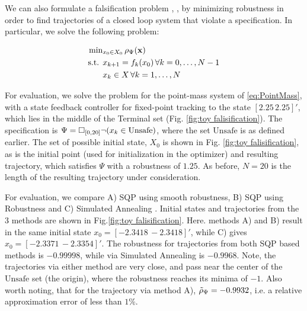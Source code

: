 We can also formulate a falsification problem \cite{AbbasATVA11_LinFalsification}, \cite{AbbasF_HybridSA12}, \cite{Deshmukh15_IterativeApproaches} by minimizing robustness in order to find trajectories of a closed loop system that violate a specification. In particular, we solve the following problem:

\begin{subequations}
\label{eq:falsification}
\begin{align}
\text{min}&_{x_0 \in X_0 } \, \rho_{\Psi}(\mathbf{x}) \nonumber \\
\text{s.t. } & x_{k+1} = f_k(x_0) \, \forall k=0,\dotsc,N-1 \\
&  x_{k} \in X \, \forall k=1,\dotsc,N
\end{align}
\end{subequations}

For evaluation, we solve the problem for the point-mass system of \eqref{eq:PointMass}, with a state feedback controller for fixed-point tracking to the state $[2.25\,2.25]'$, which lies in the middle of the Terminal set (Fig. \ref{fig:toy falisification}). The specification is $\Psi=\square_{[0,20]} \neg (x_k \in \text{Unsafe})$, where the set $\text{Unsafe}$ is as defined earlier. The set of possible initial state, $X_0$ is shown in Fig. \ref{fig:toy falisification}, as is the initial point (used for initialization in the optimizer) and resulting trajectory, which satisfies $\Psi$ with a robustness of $1.25$. As before, $N=20$ is the length of the resulting trajectory under consideration.

For evaluation, we compare A) SQP using smooth robustness, B) SQP using Robustness and C) Simulated Annealing \cite{SABOOK}. Initial states and trajectories from the 3 methods are shown in Fig.\ref{fig:toy falisification}. Here. methods A) and B) result in the same initial state $x_0=[-2.3418\, -2.3418]'$, while C) gives $x_0=[-2.3371\, -2.3354]'$. The robustness for trajectories from both SQP based methods is $-0.99998$, while via Simulated Annealing is $-0.9968$. Note, the trajectories via either method are very close, and pass near the center of the $\text{Unsafe}$ set (the origin), where the robustness reaches its minima of $-1$. Also worth noting, that for the trajectory via method A), $\tilde{\rho}_{\Psi}=-0.9932$, i.e. a relative approximation error of less than $1\%$.

